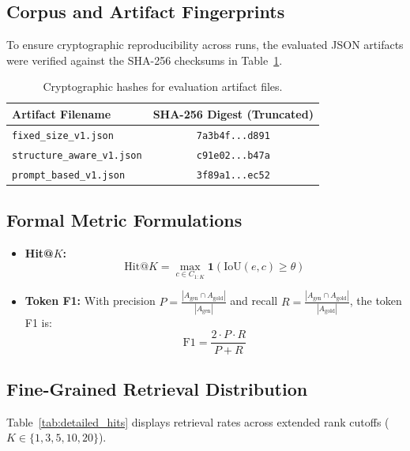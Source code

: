 \subsection{Corpus and Artifact Fingerprints}
To ensure cryptographic reproducibility across runs, the evaluated JSON artifacts were verified against the SHA-256 checksums in Table~\ref{tab:artifact_hashes}.

\begin{table}[h]
    \centering
    \footnotesize
    \setlength{\tabcolsep}{4pt}
    \begin{tabular}{lc}
        \toprule
        \textbf{Artifact Filename} & \textbf{SHA-256 Digest (Truncated)} \\
        \midrule
        \texttt{fixed\_size\_v1.json}      & \texttt{7a3b4f...d891} \\
        \texttt{structure\_aware\_v1.json} & \texttt{c91e02...b47a} \\
        \texttt{prompt\_based\_v1.json}    & \texttt{3f89a1...ec52} \\
        \bottomrule
    \end{tabular}
    \caption{Cryptographic hashes for evaluation artifact files.}
    \label{tab:artifact_hashes}
\end{table}

\subsection{Formal Metric Formulations}
\begin{itemize}
    \item \textbf{Hit@$K$:}
    \begin{equation}
        \text{Hit@}K = \max_{c \in C_{1:K}} \mathbf{1}(\text{IoU}(e, c) \ge \theta)
    \end{equation}
    \item \textbf{Token F1:} With precision $P = \frac{|A_{\text{gen}} \cap A_{\text{gold}}|}{|A_{\text{gen}}|}$ and recall $R = \frac{|A_{\text{gen}} \cap A_{\text{gold}}|}{|A_{\text{gold}}|}$, the token F1 is:
    \begin{equation}
        \text{F1} = \frac{2 \cdot P \cdot R}{P + R}
    \end{equation}
\end{itemize}

\subsection{Fine-Grained Retrieval Distribution}
Table~\ref{tab:detailed_hits} displays retrieval rates across extended rank cutoffs ($K \in \{1, 3, 5, 10, 20\}$).

